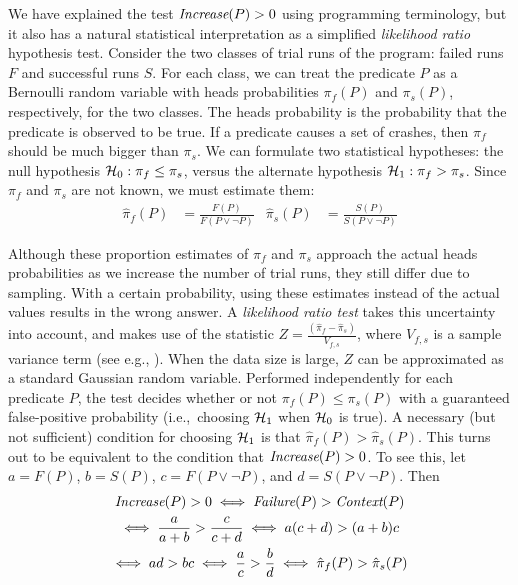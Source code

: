 We have explained the test $\textit{Increase}(P) > 0$ using programming terminology,
but it also has a natural statistical interpretation as a simplified {\em likelihood ratio} hypothesis
test.  Consider the two classes of trial runs
of the program: failed runs $F$ and successful runs $S$.  For each
class, we can treat the predicate $P$ as a Bernoulli random variable
with heads probabilities $\pi_f(P)$ and $\pi_s(P)$, respectively, for the
two classes.  The heads
probability is the probability that the predicate is observed to be
true.  If a predicate causes a set of crashes, then $\pi_f$ should be
much bigger than $\pi_s$.  We can formulate two statistical hypotheses:
the null hypothesis ${\mathcal{H}}_0:
\pi_f \leq \pi_s$, versus the alternate hypothesis ${\mathcal{H}}_1: \pi_f > \pi_s$.  Since
$\pi_f$ and $\pi_s$ are not known, we must estimate them:
\begin{align*}
  \hat \pi_f(P) &= \frac{F(P)}{F(P \lor \lnot P)} &
  \hat \pi_s(P) &= \frac{S(P)}{S(P \lor \lnot P)}
\end{align*}

Although these proportion estimates of $\pi_f$ and $\pi_s$ approach the
actual heads probabilities as we increase the number of trial runs, they
still differ due to sampling.  With a certain probability, using these
estimates instead of the actual values results in the wrong
answer.  A \textit{likelihood ratio test} takes this uncertainty into
account, and makes use of the statistic $ Z = \frac{(\hat \pi_f - \hat
  \pi_s)}{V_{f,s}}$, where $V_{f,s}$ is a sample variance term (see
e.g., \cite{Lehmann:1986:hyptest}).  When
the data size is large, $Z$ can be approximated as a standard Gaussian
random variable.  Performed independently for each predicate $P$, the
test decides whether or not $\pi_f(P) \leq \pi_s(P)$ with a guaranteed
false-positive probability (i.e.,\ choosing ${\mathcal{H}}_1$ when ${\mathcal{H}}_0$ is true).
A necessary (but not sufficient) condition for choosing ${\mathcal{H}}_1$ is that
$\hat \pi_f(P) > \hat \pi_s(P)$.  This turns out to be
equivalent to the condition that $\textit{Increase}(P) > 0$.  To see this,
let $a = F(P)$, $b = S(P)$, $c = F(P\lor\lnot P)$, and $d = S(P\lor\lnot P)$.
Then
\begin{gather*}
  \textit{Increase}(P) > 0 \iff \textit{Failure}(P) > \textit{Context}(P) \\
  \iff \frac{a}{a+b} > \frac{c}{c+d}
  \iff a (c+d) > (a+b) c \\
  \iff ad > bc \iff \frac{a}{c} > \frac{b}{d}
  \iff \hat \pi_f(P) > \hat \pi_s(P)
\end{gather*}

